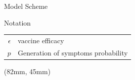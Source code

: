 \begin{frame}{Model Scheme}
\begin{textblock*}{75mm}
{        \begin{bluebox}{Notation}
            \begin{tabular}{rl}
                $\epsilon$
                & vaccine efficacy
                \\
                $p$
                & Generation of symptoms  probability
            \end{tabular}
        \end{bluebox}
        }
    \end{textblock*}
%
    \begin{textblock*}{45mm}(82mm, 45mm)
    \end{textblock*}
\end{frame}

